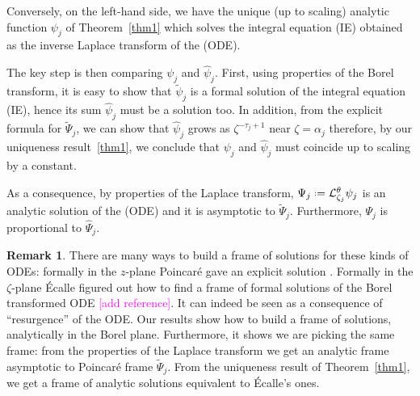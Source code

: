 \documentclass{article}
\theoremstyle{definition}
\newcommand{\series}[1]{\tilde{#1}}
\newcommand*{\defeq}{\mathrel{\vcenter{\baselineskip0.5ex \lineskiplimit0pt
                     \hbox{\scriptsize.}\hbox{\scriptsize.}}}%
                     =}
\newcommand{\laplace}{\mathcal{L}}
\newcommand{\borel}{\mathcal{B}}
\newtheorem{remark}[definition]{Remark}
\begin{document}
\begin{center}
\end{center} 

Conversely, on the left-hand side, we have the unique (up to scaling) analytic function $\psi_j$ of Theorem~\ref{thm1} which solves the integral equation (IE) obtained as the inverse Laplace transform of the (ODE).   

The key step is then comparing $\psi_j$ and $\hat{\psi}_j$. First, using properties of the Borel transform, it is easy to show that $\series{\psi}_j$ is a formal solution of the integral equation (IE), hence its sum $\hat{\psi}_j$ must be a solution too. In addition, from the explicit formula for $\tilde{\Psi}_j$, we can show that $\hat{\psi}_j$ grows as $\zeta^{-\tau_j+1}$ near $\zeta=\alpha_j$
therefore, by our uniqueness result~\ref{thm1}, we conclude that $\psi_j$ and $\hat{\psi}_j$ must coincide up to scaling by a constant. 

As a consequence, by properties of the Laplace transform, $\Psi_j\defeq\laplace_{\zeta_j}^{\theta}\psi_j$ is an analytic solution of the (ODE) and it is asymptotic to $\series{\Psi}_j$. Furthermore, $\Psi_j$ is proportional to $\hat{\Psi}_j$.   

\begin{remark}
There are many ways to build a frame of solutions for these kinds of ODEs: formally in the $z$-plane Poincar\'e gave an explicit solution \cite{int-irreg}. Formally in the $\zeta$-plane \'Ecalle figured out how to find a frame of formal solutions of the Borel transformed ODE \textcolor{magenta}{[add reference]}. It can indeed be seen as a consequence of ``resurgence'' of the ODE. Our results show how to build a frame of solutions, analytically in the Borel plane. Furthermore, it shows we are picking the same frame: from the properties of the Laplace transform we get an analytic frame asymptotic to Poincar\'e frame $\series{\Psi}_j$. From the uniqueness result of Theorem~\ref{thm1}, we get a frame of analytic solutions equivalent to \'Ecalle's ones. 
\end{remark} 
\end{document}
